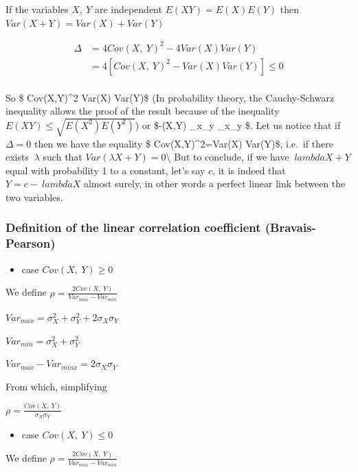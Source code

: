 \documentclass[
]{report}
\providecommand{\tightlist}{%
  \setlength{\itemsep}{0pt}\setlength{\parskip}{0pt}}
\begin{document}
If the variables \(X,~Y\) are independent \(E(XY) = E(X)E(Y)\) then
\(Var(X+Y) = Var(X) + Var(Y)\)

\begin{align*}
\Delta &= 4Cov(X,~Y)^2-4Var(X)Var(Y)\\
&=4[Cov(X,~Y)^2-Var(X)Var(Y)] \leq 0\\
\end{align*}

So \$ Cov(X,Y)\^{}2 \leq Var(X) Var(Y)\$ (In probability theory, the Cauchy-Schwarz inequality allows the proof of the result because of the inequality \(E(XY)\leq \sqrt{E(X^2)E(Y^2)}\))
or \$-(X,Y) \leq \sigma\_x\sigma\_y \leq \sigma\_x\sigma\_y \$.
Let us notice that if \(\Delta=0\) then we have the equality \$ Cov(X,Y)\^{}2=Var(X) Var(Y)\$, i.e.~if there exists \(~\lambda\) such that \(Var(\lambda X+Y)=0\)\textbackslash{}
But to conclude, if we have \(~lambda X+Y\) equal with probability 1 to a constant, let's say \(c\), it is indeed that \(Y = c -~lambda X\) almost surely, in other words a perfect linear link between the two variables.

\hypertarget{definition-of-the-linear-correlation-coefficient-bravais-pearson}{%
\subsubsection{Definition of the linear correlation coefficient (Bravais-Pearson)}\label{definition-of-the-linear-correlation-coefficient-bravais-pearson}}

\begin{itemize}
\tightlist
\item
  case \(Cov(X,~Y)\geq 0\)
\end{itemize}

We define
\(\rho = \frac{2Cov(X,~Y)}{Var_{max}-Var_{min}}\)

\(Var_{max} = \sigma_X^2+\sigma_Y^2+2\sigma_X\sigma_Y\)

\(Var_{min} = \sigma_X^2+\sigma_Y^2\)

\(Var_{max}-Var_{minx} = 2\sigma_X\sigma_Y\)

From which, simplifying

\(\rho = \frac{Cov(X,~Y)}{\sigma_X\sigma_Y}\)

\begin{itemize}
\tightlist
\item
  case \(Cov(X,~Y)\leq 0\)
\end{itemize}

We define
\(\rho = \frac{2Cov(X,~Y)}{Var_{max}-Var_{min}}\)
\end{document}

